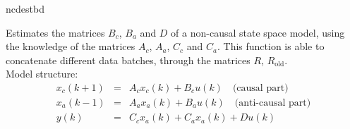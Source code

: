 \documentclass{book}
\begin{document}
\begin{command}{ncdestbd}
\begin{purpose}
  Estimates the matrices $B_c$, $B_a$ and $D$ of a non-causal state
  space model, using the knowledge of the matrices $A_c$, $A_a$, $C_c$
  and $C_a$. This function is able to concatenate different data
  batches, through the matrices $R$, $R_{\mbox{old}}$.\\
  Model structure:
  \begin{eqnarray*}
    x_c(k+1) &=& A_c x_c(k) + B_c u(k)\quad\mbox{(causal part)}\\
    x_a(k-1) &=& A_a x_a(k) + B_a u(k)\quad\mbox{(anti-causal part)}\\
    y(k)   &=& C_c x_a(k) + C_a x_a(k) + D u(k)
  \end{eqnarray*}
 

\end{purpose}
\end{command}
\end{document}
